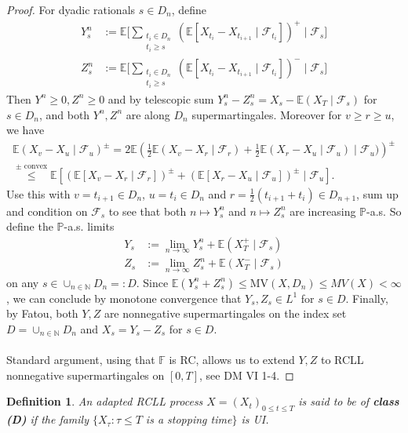\documentclass[12pt,a4paper, twoside]{article}
\newtheorem{defn}{Definition}[section]
\theoremstyle{definition}
\newcommand{\EE}{\mathbb{E}} %
\newcommand{\PP}{\mathbb{P}} %
\newcommand{\MV}{\text{MV}}
\begin{document}
\begin{proof}
For dyadic rationals $s \in D_n$, define 
\begin{align*}
Y_s^n &:= \EE \Big[ \sum_{\substack{ t_i \in D_n \\ t_i \geq s}} ( \EE [X_{t_i}-X_{t_{i+1}} \mid \mathcal{F}_{t_i}])^+ \mid \mathcal{F}_s \Big] \\
Z_s^n &:= \EE \Big[ \sum_{\substack{ t_i \in D_n \\ t_i \geq s}} ( \EE [X_{t_i}-X_{t_{i+1}} \mid \mathcal{F}_{t_i}])^- \mid \mathcal{F}_s \Big]
\end{align*}
Then $Y^n \geq 0, Z^n \geq 0$ and by telescopic sum $Y_s^n -Z_s^n = X_s - \EE(X_T \mid \mathcal{F}_s)$ for $s \in D_n$, and both $Y^n, Z^n$ are along $D_n$ supermartingales. Moreover for $v \geq r \geq u$, we have
\begin{align*}
\EE( X_v-X_u \mid \mathcal{F}_u)^\pm =2 \mathbb{E}\left( \frac{1}{2} \EE (X_v-X_r \mid \mathcal{F}_r) + \frac{1}{2} \EE( X_r-X_u \mid \mathcal{F}_u)  \mid \mathcal{F}_u) \right)^\pm 
\\
\overset{\pm \text{ convex}}\leq \EE[( \EE[X_v-X_r \mid \mathcal{F}_r])^\pm + ( \EE[X_r-X_u \mid \mathcal{F}_u])^\pm \mid \mathcal{F}_u].
\end{align*}
Use this with $v=t_{i+1} \in D_n$, $u = t_i \in D_n$ and $r= \frac{1}{2}(t_{i+1}+t_i) \in D_{n+1}$, sum up and condition on $\mathcal{F}_s$ to see that both $n \mapsto Y_s^n$ and $n \mapsto Z_s^n$ are increasing $\PP$-a.s. So define the $\PP$-a.s. limits 
\begin{align*}
Y_s&:= \lim_{n \to \infty} Y_s^n + \EE(X_T^+ \mid \mathcal{F}_s) \\
Z_s&:= \lim_{n \to \infty} Z_s^n + \EE(X_T^- \mid \mathcal{F}_s)
\end{align*}
on any $s \in \cup_{n \in \mathbb{N}} D_n =: D$. Since $\EE( Y_s^n + Z_s^n) \leq \MV(X,D_n) \leq MV(X) < \infty$, we can conclude by monotone convergence that $Y_s, Z_s \in L^1$ for $s \in D$. Finally, by Fatou, both $Y,Z$ are nonnegative supermartingales on the index set $D= \cup_{n \in \mathbb{N}} D_n$ and $X_s= Y_s-Z_s$ for $s \in D$. 
\\\\
Standard argument, using that $\mathbb{F}$ is RC, allows us to extend $Y,Z$ to RCLL nonnegative supermartingales on $[0,T]$, see DM VI 1-4.
\end{proof}
\newpage
\begin{defn} An adapted RCLL process $X=(X_t)_{0 \leq t \leq T}$ is said to be of \textbf{class (D)} if the family $\{ X_\tau : \tau \leq T$ is a stopping time$\}$ is UI.   
\end{defn}
\end{document}
